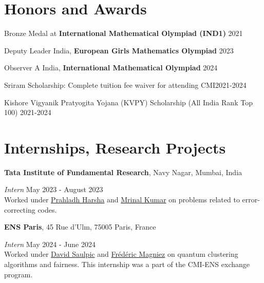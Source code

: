 \documentclass[margin,line, 10pt]{res}
\begin{document}
\begin{resume}
\section{\sc Honors and Awards} 

Bronze Medal at {\bf International Mathematical Olympiad (IND1)} \hfill 2021

\vspace*{-2.5mm}

Deputy Leader India, {\bf European Girls Mathematics Olympiad} \hfill 2023

\vspace*{-2.5mm}

Observer A India, {\bf International Mathematical Olympiad} \hfill 2024

\vspace*{-2.5mm}

Sriram Scholarship: Complete tuition fee waiver for attending CMI\hfill 2021-2024

\vspace*{-2.5mm}

Kishore Vigyanik Pratyogita Yojana (KVPY) Scholarship (All India Rank Top 100) \hfill 2021-2024


\section{\sc Internships, Research Projects}
{\bf Tata Institute of Fundamental Research}, Navy Nagar, Mumbai, India

\vspace{-.3cm}
{\em Intern} \hfill {May 2023 - August 2023}\\
Worked under \href{https://www.tifr.res.in/~prahladh/}{Prahladh Harsha} and \href{https://mrinalkr.bitbucket.io/}{Mrinal Kumar} on problems related to error-correcting codes.

{\bf ENS Paris}, 45 Rue d'Ulm, 75005 Paris, France

\vspace{-.3cm}
{\em Intern} \hfill {May 2024 - June 2024}\\
Worked under \href{https://www.normalesup.org/~saulpic/}{David Saulpic} and \href{https://www.irif.fr/~magniez/}{Frédéric Magniez} on quantum clustering algorithms and fairness. This internship was a part of the CMI-ENS exchange program.



\end{resume}
\end{document}
